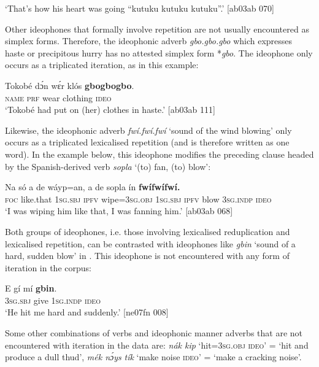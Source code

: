 \glt ‘That’s how his heart was going “kutuku kutuku kutuku”.’ [ab03ab 070]
\z

Other ideophones that formally involve repetition are not usually encountered as simplex forms. Therefore, the ideophonic adverb \textit{gbo.gbo.gbo} which expresses haste or precipitous hurry has no attested simplex form *\textit{gbo}. The ideophone only occurs as a triplicated iteration, as in this example: 


\ea%
    \label{ex:key:1620}
    \gll Tokobé  dɔ́n  wɛ́r    klós    \textbf{gbogbogbo}.\\
\textsc{name}  \textsc{prf}  wear  clothing  \textsc{ideo}\\

\glt ‘Tokobé had put on (her) clothes in haste.’ [ab03ab 111]
\z

Likewise, the ideophonic adverb \textit{fwí.fwí.fwí} ‘sound of the wind blowing’ only occurs as a triplicated lexicalised repetition (and is therefore written as one word). In the example below, this ideophone modifies the preceding clause headed by the Spanish-derived verb \textit{sopla} ‘(to) fan, (to) blow’:


\ea%
    \label{ex:key:1621}
    \gll Na  só    a    de  wáyp=an,  a    de  sopla  ín    \textbf{fwífwífwí.}\\
\textsc{foc}  like.that  \textsc{1sg.sbj}  \textsc{ipfv}  wipe=\textsc{3sg.obj}  \textsc{1sg.sbj}  \textsc{ipfv}  blow  \textsc{3sg.indp}  \textsc{ideo}\\

\glt ‘I was wiping him like that, I was fanning him.’ [ab03ab 068]
\z

Both groups of ideophones, i.e. those involving lexicalised reduplication and lexicalised repetition, can be contrasted with ideophones like \textit{gbin} ‘sound of a hard, sudden blow’ in . This ideophone is not encountered with any form of iteration in the corpus:

\ea%
    \label{ex:key:1622}
    \gll E    gí  mí    \textbf{gbin}.\\
\textsc{3sg.sbj}  give  \textsc{1sg.indp}  \textsc{ideo}\\

\glt ‘He hit me hard and suddenly.’ [ne07fn 008]
\z

Some other combinations of verbs and ideophonic manner adverbs that are not encountered with iteration in the data are: \textit{nák kip} ‘hit=\textsc{3sg.obj} \textsc{ideo’} = ‘hit and produce a dull thud’, \textit{mék nɔ́ys} \textit{tík} ‘make noise \textsc{ideo}’ = ‘make a cracking noise’.


